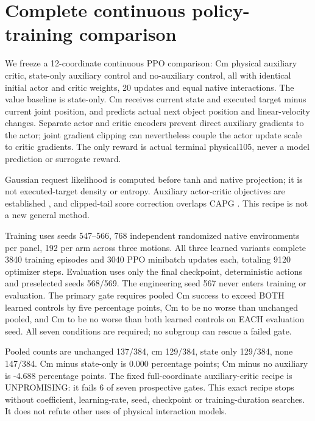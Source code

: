 \documentclass[10pt]{article}
\begin{document}
\section{Complete continuous policy-training comparison}
We freeze a 12-coordinate continuous PPO comparison: Cm physical auxiliary
critic, state-only auxiliary control and no-auxiliary control, all with identical
initial actor and critic weights, 20 updates and equal native interactions.
The value baseline is state-only. Cm receives current state and executed target
minus current joint position, and predicts actual next object position and
linear-velocity changes. Separate actor and critic encoders prevent direct
auxiliary gradients to the actor; joint gradient clipping can nevertheless
couple the actor update scale to critic gradients. The only reward is actual
terminal physical105, never a model prediction or surrogate reward.

Gaussian request likelihood is computed before tanh and native projection;
it is not executed-target density or entropy. Auxiliary actor-critic objectives
are established \cite{jaderberg2016}, and clipped-tail score correction
overlaps CAPG \cite{fujita2018}. This recipe is not a new general method.

Training uses seeds 547--566, 768 independent randomized native environments
per panel, 192 per arm across three motions. All three learned variants complete
3840 training episodes and 3040 PPO minibatch updates each, totaling 9120
optimizer steps. Evaluation uses only the final checkpoint, deterministic
actions and preselected seeds 568/569. The engineering seed 567 never enters
training or evaluation. The primary gate requires pooled Cm success to exceed
BOTH learned controls by five percentage points, Cm to be no worse than unchanged
pooled, and Cm to be no worse than both learned controls on EACH evaluation seed.
All seven conditions are required; no subgroup can rescue a failed gate.

\begin{table}[ht]
\centering

\caption{Final-checkpoint-only physical105 success counts. Denominators in each
row apply to each arm. Motions and environment seeds share one optimization
seed; these are Probe results, not independent training replications.}
\end{table}

Pooled counts are unchanged 137/384, cm 129/384, state only 129/384, none 147/384. Cm minus state-only is 0.000 percentage points; Cm minus no auxiliary is -4.688 percentage points. The fixed full-coordinate auxiliary-critic recipe is UNPROMISING: it fails 6 of seven prospective gates. This exact recipe stops without coefficient, learning-rate, seed, checkpoint or training-duration searches. It does not refute other uses of physical interaction models.
\end{document}
